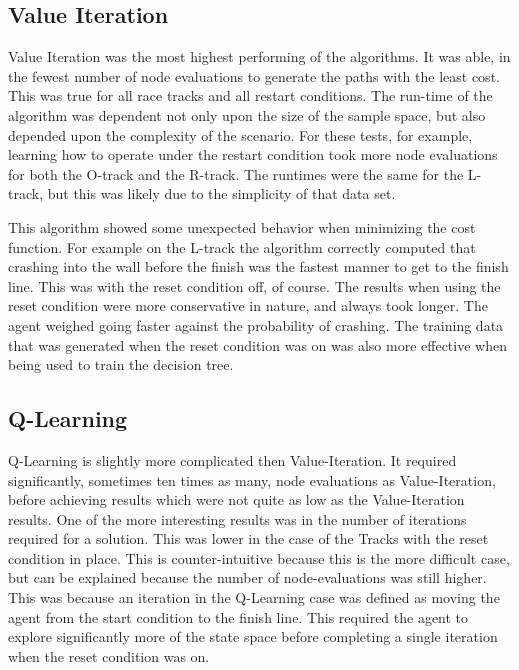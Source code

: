\documentclass[12pt,letterpaper]{article}
\begin{document}
\subsection{Value Iteration}
Value Iteration was the most highest performing of the algorithms. It was able, in the fewest number of node evaluations to generate the paths with the least cost. This was true for all race tracks and all restart conditions. The run-time of the algorithm was dependent not only upon the size of the sample space, but also depended upon the complexity of the scenario. For these tests, for example, learning how to operate under the restart condition took more node evaluations for both the O-track and the R-track. The runtimes were the same for the L-track, but this was likely due to the simplicity of that data set. 

This algorithm showed some unexpected behavior when minimizing the cost function. For example on the L-track the algorithm correctly computed that crashing into the wall before the finish was the fastest manner to get to the finish line. This was with the reset condition off, of course. The results when using the reset condition were more conservative in nature, and always took longer. The agent weighed going faster against the probability of crashing. The training data that was generated when the reset condition was on was also more effective when being used to train the decision tree. 

\subsection{Q-Learning}
Q-Learning is slightly more complicated then Value-Iteration. It required significantly, sometimes ten times as many, node evaluations as Value-Iteration, before achieving results which were not quite as low as the Value-Iteration results. One of the more interesting results was in the number of iterations required for a solution. This was lower in the case of the Tracks with the reset condition in place. This is counter-intuitive because this is the more difficult case, but can be explained because the number of node-evaluations was still higher. This was because an iteration in the Q-Learning case was defined as moving the agent from the start condition to the finish line. This required the agent to explore significantly more of the state space before completing a single iteration when the reset condition was on. 
\end{document}

